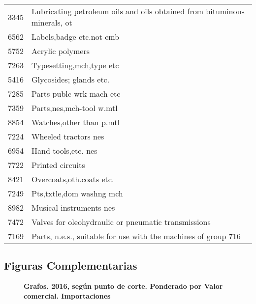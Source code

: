 \documentclass[class=article, crop=false]{standalone}
\begin{document}
\begin{longtable}{ll}
	3345          & Lubricating petroleum oils and oils obtained from bituminous minerals, ot \\
	6562          & Labels,badge etc.not emb                                                  \\
	5752          & Acrylic polymers                                                          \\
	7263          & Typesetting,mch,type etc                                                  \\
	5416          & Glycosides; glands etc.                                                   \\
	7285          & Parts publc wrk mach etc                                                  \\
	7359          & Parts,nes,mch-tool w.mtl                                                  \\
	8854          & Watches,other than p.mtl                                                  \\
	7224          & Wheeled tractors nes                                                      \\
	6954          & Hand tools,etc. nes                                                       \\
	7722          & Printed circuits                                                          \\
	8421          & Overcoats,oth.coats etc.                                                  \\
	7249          & Pts,txtle,dom washng mch                                                  \\
	8982          & Musical instruments nes                                                   \\
	7472          & Valves for oleohydraulic or pneumatic transmissions                       \\
	7169          & Parts, n.e.s., suitable for use with the machines of group 716            \\ \hline
\end{longtable}

\pagebreak

\subsection{Figuras Complementarias}\label{sec:fig_comp}

\begin{figure}
	\centering
	\caption{\textbf{Grafos. 2016, según punto de corte. Ponderado por Valor comercial. Importaciones}}
	\label{fig:grafo_2016_circular}
\end{figure}
\end{document}
